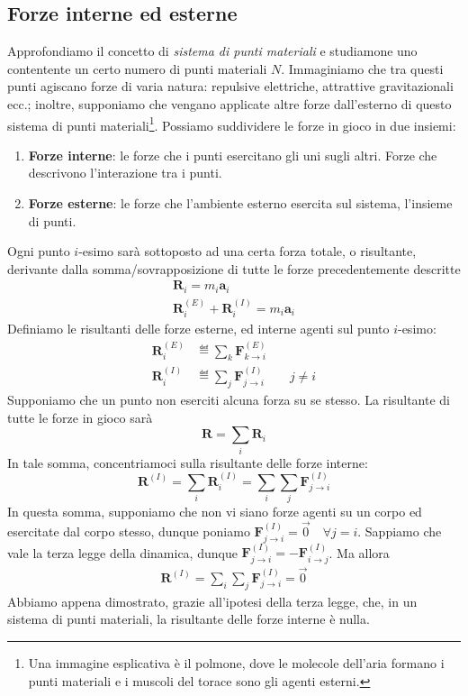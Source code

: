 \subsection{Forze interne ed esterne}
Approfondiamo il concetto di \textit{sistema di punti materiali} e studiamone
uno contentente un certo numero di punti materiali $N$. Immaginiamo che
tra questi punti agiscano forze di varia natura: repulsive elettriche,
attrattive gravitazionali ecc.; inoltre, supponiamo che vengano applicate
altre forze dall'esterno di questo sistema di punti materiali\footnote{Una
immagine esplicativa è il polmone, dove le molecole dell'aria formano i
punti materiali e i muscoli del torace sono gli agenti esterni.}.
Possiamo suddividere le forze in gioco in due insiemi:
\begin{enumerate}
    \item \textbf{Forze interne}: le forze che i punti esercitano gli uni
    sugli altri. Forze che descrivono l'interazione tra i punti.
    \item \textbf{Forze esterne}: le forze che l'ambiente esterno esercita
    sul sistema, l'insieme di punti.
\end{enumerate}
Ogni punto $i$-esimo sarà sottoposto ad una certa forza totale, o risultante, derivante
dalla somma/sovrapposizione di tutte le forze precedentemente descritte
\begin{align*}
    \mathbf{R}_i = m_i\mathbf{a}_i\\
    \mathbf{R}^{(E)}_i + \mathbf{R}^{(I)}_i = m_i\mathbf{a}_i
\end{align*}
Definiamo le risultanti delle forze esterne, ed interne agenti sul punto
$i$-esimo:
\begin{align*}
    \mathbf{R}^{(E)}_i &\eqdef \sum_{k} \mathbf{F}^{(E)}_{k \to i}\\
    \mathbf{R}^{(I)}_i &\eqdef \sum_{j} \mathbf{F}^{(I)}_{j \to i} \qquad j \not = i
\end{align*}
Supponiamo che un punto non eserciti alcuna forza su se stesso.
La risultante di tutte le forze in gioco sarà
\[ \mathbf{R} = \sum_{i} \mathbf{R}_i \]
In tale somma, concentriamoci sulla risultante delle forze interne:
\[ \mathbf{R}^{(I)} = \sum_{i} \mathbf{R}^{(I)}_i = \sum_{i} \sum_{j} \mathbf{F}^{(I)}_{j \to i} \]
In questa somma, supponiamo che non vi siano forze agenti su un corpo
ed esercitate dal corpo stesso, dunque poniamo $\mathbf{F}^{(I)}_{j \to i} = \overrightarrow{0} \quad \forall j = i$.
Sappiamo che vale la terza legge della dinamica, dunque
$\mathbf{F}^{(I)}_{j \to i} = -\mathbf{F}^{(I)}_{i \to j}$. Ma allora
\begin{align}
    \mathbf{R}^{(I)} = \sum_{i} \sum_{j} \mathbf{F}^{(I)}_{j \to i} = \overrightarrow{0}\label{interne}
\end{align}
Abbiamo appena dimostrato, grazie all'ipotesi della terza legge,
che, in un sistema di punti materiali, la risultante delle forze interne
è nulla.

